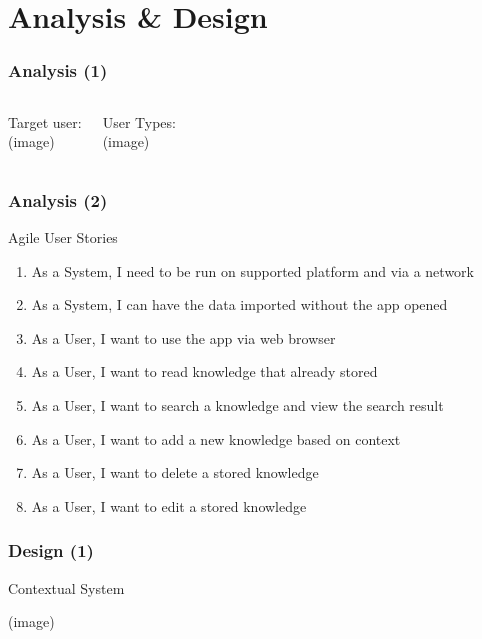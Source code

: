 \documentclass[10pt, compress]{beamer}
\begin{document}

\section{Analysis \& Design}


\begin{frame}[fragile]
  \frametitle{Analysis (1)}
  \begin{columns}[onlytextwidth]

      Target user:\\
      (image)

      User Types:\\
      (image)

  \end{columns}
\end{frame}


\begin{frame}[fragile]
  \frametitle{Analysis (2)}

  Agile User Stories
  \begin{enumerate} \itemsep0pt
    \item As a System, I need to be run on supported platform and via a network
    \item As a System, I can have the data imported without the app opened
    \item As a User, I want to use the app via web browser
    \item As a User, I want to read knowledge that already stored
    \item As a User, I want to search a knowledge and view the search result
    \item As a User, I want to add a new knowledge based on context
    \item As a User, I want to delete a stored knowledge
    \item As a User, I want to edit a stored knowledge
  \end{enumerate}

\end{frame}


\begin{frame}[fragile]
  \frametitle{Design (1)}

  \begin{center}
  Contextual System

  (image)
  \end{center}

\end{frame}
\end{document}
